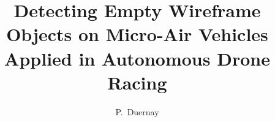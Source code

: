 \documentclass{tudelft-report}
\begin{document}
\frontmatter

\title[]{Detecting Empty Wireframe Objects on Micro-Air Vehicles \\ { \small Applied in Autonomous Drone Racing}}
\author{P.\ Duernay}



%

\tableofcontents

\mainmatter




%



%
%
%


%
%

%


\end{document}
